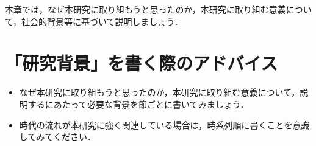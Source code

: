 本章では，なぜ本研究に取り組もうと思ったのか，本研究に取り組む意義について，社会的背景等に基づいて説明しましょう．

\section{「研究背景」を書く際のアドバイス}
\begin{itemize}
    \item なぜ本研究に取り組もうと思ったのか，本研究に取り組む意義について，説明するにあたって必要な背景を節ごとに書いてみましょう．
    \item 時代の流れが本研究に強く関連している場合は，時系列順に書くことを意識してみてください．
\end{itemize}